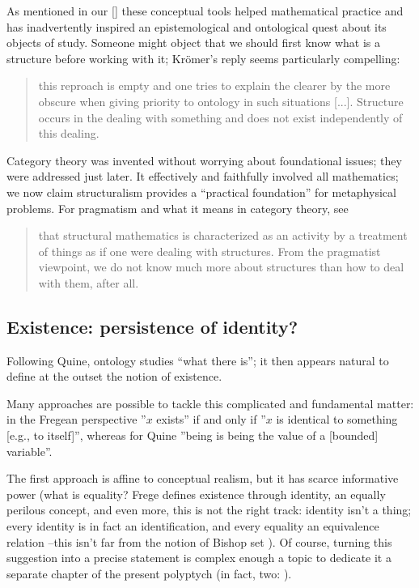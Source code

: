 As mentioned in our \autoref{} these conceptual tools helped mathematical practice and has inadvertently inspired an epistemological and ontological quest about its objects of study. Someone might object that we should first know what is a structure before working with it; Kr\"omer's reply seems particularly compelling:
\begin{quote}
	this reproach is empty and one tries to explain the clearer by the more obscure when giving priority to ontology in such situations [...]. Structure occurs in the dealing with something and does
	not exist independently of this dealing. \cite{kromer2007tool}
\end{quote}
Category theory was invented without worrying about foundational issues; they were addressed just later. It effectively and faithfully involved all mathematics; we now claim structuralism provides a ``practical foundation'' for metaphysical problems. For pragmatism and what it means in category theory, see
\begin{quote}
	that structural mathematics is characterized as an activity by a treatment of things as if one were dealing with structures. From the pragmatist viewpoint, we do not know much more about structures than how to deal with them, after all. \hfill \cite{kromer2007tool}
\end{quote}
\subsection{Existence: persistence of identity?}
Following Quine, ontology studies ``what there is''; it then appears natural to define at the outset the notion of existence.

Many approaches are possible to tackle this complicated and fundamental matter: in the Fregean perspective \cite{} ''$x$ exists'' if and only if ''$x$ is identical to something [e.g., to itself]'', whereas for Quine \cite{} ''being is being the value of a [bounded] variable''.

The first approach is affine to conceptual realism, but it has scarce informative power (what is equality? Frege defines existence through identity, an equally perilous concept, and even more, this is not the right track: identity isn't a thing; every identity is in fact an identification, and every equality an equivalence relation --this isn't far from the notion of Bishop set \cite{}). Of course, turning this suggestion into a precise statement is complex enough a topic to dedicate it a separate chapter of the present polyptych (in fact, two: \cite{black,homot}).

